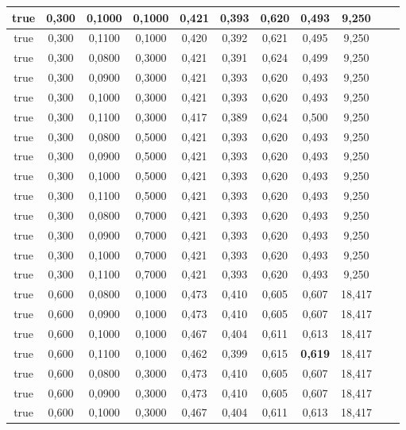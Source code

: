 \documentclass{article}
\begin{document}
\begin{longtable}[c]{|c|c|c|c|c|c|c|c|c|c|c|}
 true & 0,300 & 0,1000 & 0,1000 & 0,421 & 0,393 & 0,620 & 0,493 & 9,250  \\ \hline 
 true & 0,300 & 0,1100 & 0,1000 & 0,420 & 0,392 & 0,621 & 0,495 & 9,250  \\ \hline 
 true & 0,300 & 0,0800 & 0,3000 & 0,421 & 0,391 & 0,624 & 0,499 & 9,250  \\ \hline 
 true & 0,300 & 0,0900 & 0,3000 & 0,421 & 0,393 & 0,620 & 0,493 & 9,250  \\ \hline 
 true & 0,300 & 0,1000 & 0,3000 & 0,421 & 0,393 & 0,620 & 0,493 & 9,250  \\ \hline 
 true & 0,300 & 0,1100 & 0,3000 & 0,417 & 0,389 & 0,624 & 0,500 & 9,250  \\ \hline 
 true & 0,300 & 0,0800 & 0,5000 & 0,421 & 0,393 & 0,620 & 0,493 & 9,250  \\ \hline 
 true & 0,300 & 0,0900 & 0,5000 & 0,421 & 0,393 & 0,620 & 0,493 & 9,250  \\ \hline 
 true & 0,300 & 0,1000 & 0,5000 & 0,421 & 0,393 & 0,620 & 0,493 & 9,250  \\ \hline 
 true & 0,300 & 0,1100 & 0,5000 & 0,421 & 0,393 & 0,620 & 0,493 & 9,250  \\ \hline 
 true & 0,300 & 0,0800 & 0,7000 & 0,421 & 0,393 & 0,620 & 0,493 & 9,250  \\ \hline 
 true & 0,300 & 0,0900 & 0,7000 & 0,421 & 0,393 & 0,620 & 0,493 & 9,250  \\ \hline 
 true & 0,300 & 0,1000 & 0,7000 & 0,421 & 0,393 & 0,620 & 0,493 & 9,250  \\ \hline 
 true & 0,300 & 0,1100 & 0,7000 & 0,421 & 0,393 & 0,620 & 0,493 & 9,250  \\ \hline 
 true & 0,600 & 0,0800 & 0,1000 & 0,473 & 0,410 & 0,605 & 0,607 & 18,417  \\ \hline 
 true & 0,600 & 0,0900 & 0,1000 & 0,473 & 0,410 & 0,605 & 0,607 & 18,417  \\ \hline 
 true & 0,600 & 0,1000 & 0,1000 & 0,467 & 0,404 & 0,611 & 0,613 & 18,417  \\ \hline 
 true & 0,600 & 0,1100 & 0,1000 & 0,462 & 0,399 & 0,615 & \cellcolor{gray!20} \textbf{0,619} & 18,417  \\ \hline 
 true & 0,600 & 0,0800 & 0,3000 & 0,473 & 0,410 & 0,605 & 0,607 & 18,417  \\ \hline 
 true & 0,600 & 0,0900 & 0,3000 & 0,473 & 0,410 & 0,605 & 0,607 & 18,417  \\ \hline 
 true & 0,600 & 0,1000 & 0,3000 & 0,467 & 0,404 & 0,611 & 0,613 & 18,417  \\ \hline 

\end{longtable}
\end{document}

